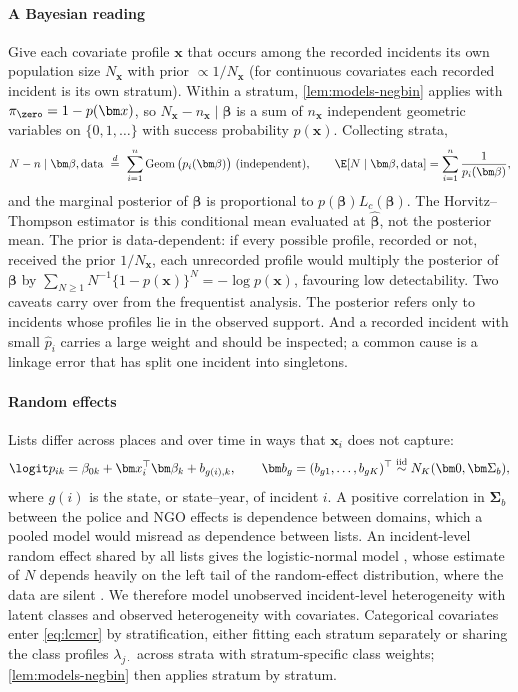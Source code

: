 \paragraph{A Bayesian reading} Give each covariate profile $\bm x$ that occurs among the recorded incidents its own population size $N_{\bm x}$ with prior $\propto1/N_{\bm x}$ (for continuous covariates each recorded incident is its own stratum). Within a stratum, \cref{lem:models-negbin} applies with $\pi_{\zero}=1-p(\bm x)$, so $N_{\bm x}-n_{\bm x}\mid\bm\beta$ is a sum of $n_{\bm x}$ independent geometric variables on $\{0,1,\dots\}$ with success probability $p(\bm x)$. Collecting strata,
\begin{equation}\label{eq:models-geom}
  N-n\mid\bm\beta,\text{data}\ \overset{d}{=}\ \sum_{i=1}^{n}\operatorname{Geom}\big(p_i(\bm\beta)\big)\ \text{(independent)},
  \qquad
  \E[N\mid\bm\beta,\text{data}]=\sum_{i=1}^{n}\frac{1}{p_i(\bm\beta)},
\end{equation}
and the marginal posterior of $\bm\beta$ is proportional to $p(\bm\beta)L_c(\bm\beta)$. The Horvitz--Thompson estimator is this conditional mean evaluated at $\widehat{\bm\beta}$, not the posterior mean. The prior is data-dependent: if every possible profile, recorded or not, received the prior $1/N_{\bm x}$, each unrecorded profile would multiply the posterior of $\bm\beta$ by $\sum_{N\ge1}N^{-1}\{1-p(\bm x)\}^{N}=-\log p(\bm x)$, favouring low detectability. Two caveats carry over from the frequentist analysis. The posterior refers only to incidents whose profiles lie in the observed support. And a recorded incident with small $\hat p_i$ carries a large weight and should be inspected; a common cause is a linkage error that has split one incident into singletons.

\paragraph{Random effects} Lists differ across places and over time in ways that $\bm x_i$ does not capture:
\begin{equation}\label{eq:models-re}
  \logit p_{ik}=\beta_{0k}+\bm x_i^{\top}\bm\beta_k+b_{g(i),k},\qquad \bm b_g=(b_{g1},\dots,b_{gK})^{\top}\overset{\text{iid}}{\sim}N_K(\bm0,\bm\Sigma_b),
\end{equation}
where $g(i)$ is the state, or state--year, of incident $i$. A positive correlation in $\bm\Sigma_b$ between the police and NGO effects is dependence between domains, which a pooled model would misread as dependence between lists. An incident-level random effect shared by all lists gives the logistic-normal model \citep{coull1999}, whose estimate of $N$ depends heavily on the left tail of the random-effect distribution, where the data are silent \citep{link2003}. We therefore model unobserved incident-level heterogeneity with latent classes and observed heterogeneity with covariates. Categorical covariates enter \eqref{eq:lcmcr} by stratification, either fitting each stratum separately or sharing the class profiles $\lambda_{j\cdot}$ across strata with stratum-specific class weights; \cref{lem:models-negbin} then applies stratum by stratum.

